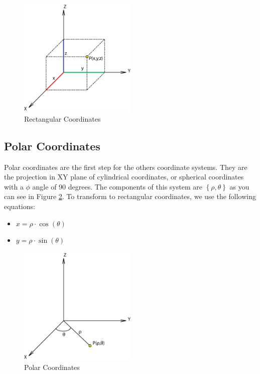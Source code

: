 \documentclass[12pt,a4paper,oneside,english]{book}
\begin{document}
\begin{figure}[htbp]
\begin{center}
\includegraphics[width=0.50\textwidth]{images/RC.png}
\caption{Rectangular Coordinates}
\label{rectangular coordinates}
\end{center}
\end{figure}

\newpage

\subsection{Polar Coordinates}

Polar coordinates are the first step for the others coordinate systems. They are the projection in XY plane of cylindrical coordinates, or spherical coordinates with a $\phi$ angle of 90 degrees. The components of this system are $\left\{\rho,\theta\right\}$ as you can see in Figure \ref{polar coordinates}. To transform to rectangular coordinates, we use the following equations:

\begin{itemize}
\item $x=\rho\cdot\cos(\theta)$
\item $y=\rho\cdot\sin(\theta)$
\end{itemize}

\begin{figure}[htbp]
\begin{center}
\includegraphics[width=0.50\textwidth]{images/PC.png}
\caption{Polar Coordinates}
\label{polar coordinates}
\end{center}
\end{figure}
\end{document}
